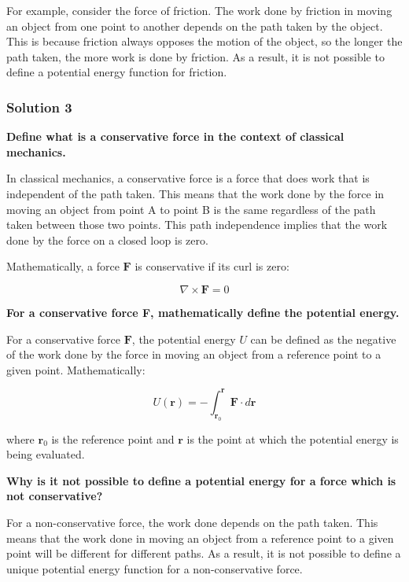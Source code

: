 \documentclass{article}
\begin{document}
For example, consider the force of friction. The work done by friction in moving an object from one point to another depends on the path taken by the object. This is because friction always opposes the motion of the object, so the longer the path taken, the more work is done by friction. As a result, it is not possible to define a potential energy function for friction.

\subsubsection{Solution 3}

\textbf{Define what is a conservative force in the context of classical mechanics.}

In classical mechanics, a conservative force is a force that does work that is independent of the path taken. This means that the work done by the force in moving an object from point A to point B is the same regardless of the path taken between those two points.  This path independence implies that the work done by the force on a closed loop is zero.

Mathematically, a force $\mathbf{F}$ is conservative if its curl is zero:

\begin{equation*}
\nabla \times \mathbf{F} = 0
\end{equation*}

\textbf{For a conservative force F, mathematically define the potential energy.}

For a conservative force $\mathbf{F}$, the potential energy $U$ can be defined as the negative of the work done by the force in moving an object from a reference point to a given point. Mathematically:

\begin{equation*}
U(\mathbf{r}) = - \int_{\mathbf{r}_0}^{\mathbf{r}} \mathbf{F} \cdot d\mathbf{r}
\end{equation*}

where $\mathbf{r}_0$ is the reference point and $\mathbf{r}$ is the point at which the potential energy is being evaluated.

\textbf{Why is it not possible to define a potential energy for a force which is not conservative?}

For a non-conservative force, the work done depends on the path taken. This means that the work done in moving an object from a reference point to a given point will be different for different paths.  As a result, it is not possible to define a unique potential energy function for a non-conservative force. 
\end{document}
